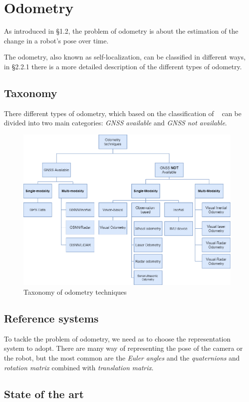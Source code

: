 \section{Odometry}\label{sec:visual-odometry}
As introduced in \S1.2, the problem of odometry is about the estimation of the change in a robot's pose over time.

The odometry, also known as self-localization, can be classified in different ways, in \S2.2.1 there is a more detailed description of the different types of odometry.

\subsection{Taxonomy}\label{subsec:tassonomy}
There different types of odometry, which based on the classification of ~\cite{vo_state_of_art} can be divided into two main categories: \textit{GNSS available} and \textit{GNSS not available}.
\begin{figure}[H]
    \centering
    \includegraphics[width=\textwidth]{images/2_2_taxonomy_odometry}
    \caption{Taxonomy of odometry techniques}\label{fig:odometry-taxonomy}
\end{figure}

\subsection{Reference systems}\label{subsec:reference-systems}
To tackle the problem of odometry, we need as to choose the representation system to adopt.
There are many way of representing the pose of the camera or the robot, but the most common are the \textit{Euler angles} and the \textit{quaternions} and \textit{rotation matrix} combined with \textit{translation matrix}.
\subsection{State of the art}\label{subsec:state-of-the-art}
